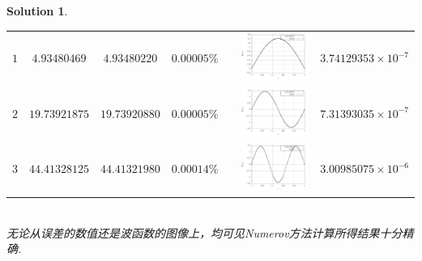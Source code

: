 \documentclass[UTF8,10pt,a4paper]{article}
\theoremstyle{Problem}
\theoremstyle{Solution}
\newtheorem*{sol}{Solution}
\begin{document}
\begin{sol}
\begin{enumerate}
\begin{table}[h]
\begin{tabular}{cccccm{}c}
                      $1$                                        & $4.93480469$                                  & $4.93480220$              & $0.00005\%$                           &  & \includegraphics[width=.33\textwidth]{1-3-1.pdf} & $3.74129353\times 10^{-7}$ \\
                      $2$                                        & $19.73921875$                                 & $19.73920880$             & $0.00005\%$                           &  & \includegraphics[width=.33\textwidth]{1-3-2.pdf} & $7.31393035\times 10^{-7}$ \\
                      $3$                                        & $44.41328125$                                 & $44.41321980$             & $0.00014\%$                           &  & \includegraphics[width=.33\textwidth]{1-3-3.pdf} & $3.00985075\times 10^{-6}$ \\ \hline
                  \end{tabular}
              \end{table}
              \\无论从误差的数值还是波函数的图像上，均可见Numerov方法计算所得结果十分精确.
    \end{enumerate}
\end{sol}
\end{document}
